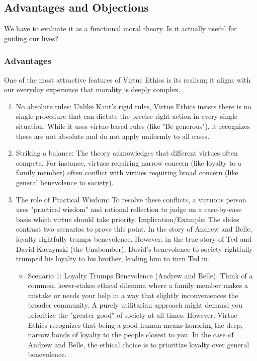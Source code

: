 \documentclass[12pt]{article}
\begin{document}
\subsection{Advantages and Objections}
We have to evaluate it as a functional moral theory. Is it actually useful for guiding our lives?
\subsubsection{Advantages}
One of the most attractive features of Virtue Ethics is its realism; it aligns with our everyday experience that morality is deeply complex.
\begin{enumerate}
    \item No absolute rules: Unlike Kant's rigid rules, Virtue Ethics insists there is no single procedure that can dictate the precise right action in every single situation. While it uses virtue-based rules (like "Be generous"), it recognizes these are not absolute and do not apply uniformly to all cases.
    \item Striking a balance: The theory acknowledges that different virtues often compete. For instance, virtues requiring narrow concern (like loyalty to a family member) often conflict with virtues requiring broad concern (like general benevolence to society).
    \item The role of Practical Wisdom: To resolve these conflicts, a virtuous person uses "practical wisdom" and rational reflection to judge on a case-by-case basis which virtue should take priority.\newline
    Implication/Example: The slides contrast two scenarios to prove this point. In the story of Andrew and Belle, loyalty rightfully trumps benevolence. However, in the true story of Ted and David Kaczynski (the Unabomber), David's benevolence to society rightfully trumped his loyalty to his brother, leading him to turn Ted in.
    \begin{itemize}
        \item Scenario 1: Loyalty Trumps Benevolence (Andrew and Belle). Think of a common, lower-stakes ethical dilemma where a family member makes a mistake or needs your help in a way that slightly inconveniences the broader community. A purely utilitarian approach might demand you prioritize the "greater good" of society at all times. However, Virtue Ethics recognizes that being a good human means honoring the deep, narrow bonds of loyalty to the people closest to you. In the case of Andrew and Belle, the ethical choice is to prioritize loyalty over general benevolence.

\end{itemize}
\end{enumerate}
\end{document}
